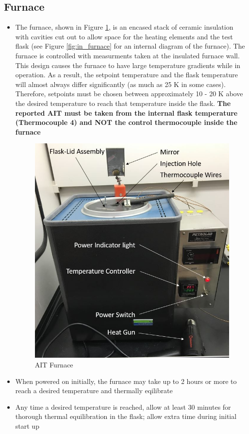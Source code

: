 \documentclass[letterpaper,11pt]{article}
\begin{document}
    \subsection{Furnace}
    \begin{itemize}
    \item The furnace, shown in Figure \ref{fig:furnace_pic}, is an encased 
        stack of ceramic insulation with cavities 
        cut out to allow space for the heating elements and the test flask
        (see Figure \ref{fig:in_furnace} for an internal diagram of the 
        furnace). The furnace is controlled with measurments taken at the 
        insulated furnace wall. This design causes the furnace to have
        large temperature gradients while in operation. As a result, the 
        setpoint temperature and the flask temperature will almost always 
        differ significantly (as much as 25 K in some cases). Therefore, 
        setpoints must be chosen between approximately 10 - 20 K above the 
        desired temperature to reach that temperature inside the flask.
        \textbf{The reported AIT must be taken from the internal flask 
        temperature (Thermocouple 4) and NOT the control thermocouple inside
        the furnace}
    
    \begin{figure}[H]
    \centering
    \includegraphics[width=.45\textwidth]{Furnace_pic_diagram.jpg}
    \caption{AIT Furnace}
    \label{fig:furnace_pic}
    \end{figure}
    
    \item When powered on initially, the furnace may take up to 2 hours or more  
        to reach a desired temperature and thermally eqilibrate
    \item Any time a desired temperature is reached, allow at least 30 
        minutes for thorough thermal equilibration in the flask; allow extra 
        time during initial start up


\end{itemize}
\end{document}
